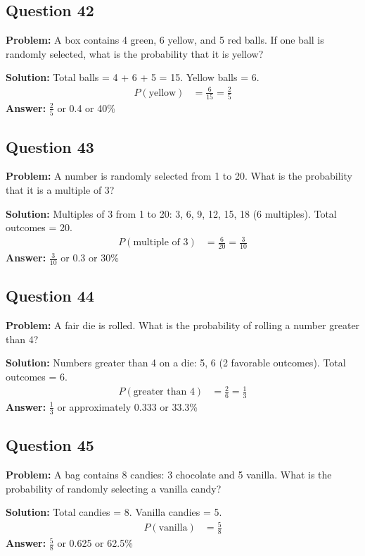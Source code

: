 \documentclass[12pt]{article}
\begin{document}
\subsection*{Question 42}
\textbf{Problem:} A box contains 4 green, 6 yellow, and 5 red balls. If one ball is randomly selected, what is the probability that it is yellow?

\textbf{Solution:} Total balls = 4 + 6 + 5 = 15. Yellow balls = 6.
\begin{align*}
P(\text{yellow}) &= \frac{6}{15} = \frac{2}{5}
\end{align*}
\textbf{Answer:} $\frac{2}{5}$ or 0.4 or 40\%

\subsection*{Question 43}
\textbf{Problem:} A number is randomly selected from 1 to 20. What is the probability that it is a multiple of 3?

\textbf{Solution:} Multiples of 3 from 1 to 20: 3, 6, 9, 12, 15, 18 (6 multiples). Total outcomes = 20.
\begin{align*}
P(\text{multiple of 3}) &= \frac{6}{20} = \frac{3}{10}
\end{align*}
\textbf{Answer:} $\frac{3}{10}$ or 0.3 or 30\%

\subsection*{Question 44}
\textbf{Problem:} A fair die is rolled. What is the probability of rolling a number greater than 4?

\textbf{Solution:} Numbers greater than 4 on a die: 5, 6 (2 favorable outcomes). Total outcomes = 6.
\begin{align*}
P(\text{greater than 4}) &= \frac{2}{6} = \frac{1}{3}
\end{align*}
\textbf{Answer:} $\frac{1}{3}$ or approximately 0.333 or 33.3\%

\subsection*{Question 45}
\textbf{Problem:} A bag contains 8 candies: 3 chocolate and 5 vanilla. What is the probability of randomly selecting a vanilla candy?

\textbf{Solution:} Total candies = 8. Vanilla candies = 5.
\begin{align*}
P(\text{vanilla}) &= \frac{5}{8}
\end{align*}
\textbf{Answer:} $\frac{5}{8}$ or 0.625 or 62.5\%
\end{document}
